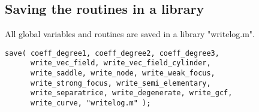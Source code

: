 \documentclass[a4paper,10pt]{article}
\begin{document}
\subsection{Saving the routines in a library}

All global variables and routines are saved in a library "writelog.m".

\begin{lstlisting}[name=writelog]
save( coeff_degree1, coeff_degree2, coeff_degree3,
      write_vec_field, write_vec_field_cylinder,
      write_saddle, write_node, write_weak_focus,
      write_strong_focus, write_semi_elementary,
      write_separatrice, write_degenerate, write_gcf,
      write_curve, "writelog.m" );
\end{lstlisting}
\end{document}
